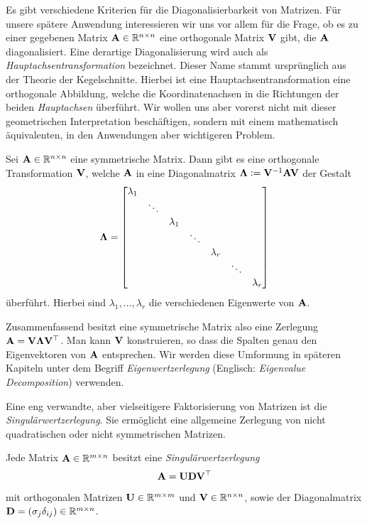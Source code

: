 Es gibt verschiedene Kriterien für die Diagonalisierbarkeit von Matrizen. Für unsere spätere Anwendung interessieren wir uns vor allem für die Frage, ob es zu einer gegebenen Matrix $\mathbf{A} \in \mathbb{R}^{n \times n}$ eine orthogonale Matrix $\mathbf{V}$ gibt, die $\mathbf{A}$ diagonalisiert. Eine derartige Diagonalisierung wird auch als \textit{Hauptachsentransformation} bezeichnet. Dieser Name stammt ursprünglich aus der Theorie der Kegelschnitte. Hierbei ist eine Hauptachsentransformation eine orthogonale Abbildung, welche die Koordinatenachsen in die Richtungen der beiden \textit{Hauptachsen} überführt. Wir wollen uns aber vorerst nicht mit dieser geometrischen Interpretation beschäftigen, sondern mit einem mathematisch äquivalenten, in den Anwendungen aber wichtigeren Problem.

\begin{thm}
Sei $\mathbf{A} \in \mathbb{R}^{n \times n}$ eine symmetrische Matrix. Dann gibt es eine orthogonale Transformation $\mathbf{V}$, welche $\mathbf{A}$ in eine Diagonalmatrix $\mathbf{\Lambda} \vcentcolon= \mathbf{V}^{-1}\mathbf{A}\mathbf{V}$ der Gestalt
$$\mathbf{\Lambda} = \begin{bmatrix}
    \lambda_{1} & & & & & & \\
    & \ddots & & & & & \\
    & & \lambda_1 & & & & \\
    & & & \ddots & & & \\
    & & & &\lambda_r & & \\
    & & & & & \ddots & \\
    & & & & & & \lambda_{r}
  \end{bmatrix}$$
überführt. Hierbei sind $\lambda_1, \ldots, \lambda_r$ die verschiedenen Eigenwerte von $\mathbf{A}$.
\end{thm}

Zusammenfassend besitzt eine symmetrische Matrix also eine Zerlegung $\mathbf{A} = \mathbf{V} \mathbf{\Lambda} \mathbf{V}^{\top}$. Man kann $\mathbf{V}$ konstruieren, so dass die Spalten genau den Eigenvektoren von $\mathbf{A}$ entsprechen. Wir werden diese Umformung in späteren Kapiteln unter dem Begriff \textit{Eigenwertzerlegung} (Englisch: \textit{Eigenvalue Decomposition}) verwenden. 

Eine eng verwandte, aber vielseitigere Faktorisierung von Matrizen ist die \textit{Singulärwertzerlegung}. Sie ermöglicht eine allgemeine Zerlegung von nicht quadratischen oder nicht symmetrischen Matrizen.

\begin{thm}
Jede Matrix $\mathbf{A} \in \mathbb{R}^{m \times n}$ besitzt eine \textit{Singulärwertzerlegung} 
$$\mathbf{A} = \mathbf{U}\mathbf{D}\mathbf{V}^{\top}$$
mit orthogonalen Matrizen $\mathbf{U} \in \mathbb{R}^{m \times m}$ und $\mathbf{V} \in \mathbb{R}^{n \times n}$, sowie der Diagonalmatrix $\mathbf{D} = (\sigma_j\delta_{ij}) \in \mathbb{R}^{m \times n}$.
\end{thm}

